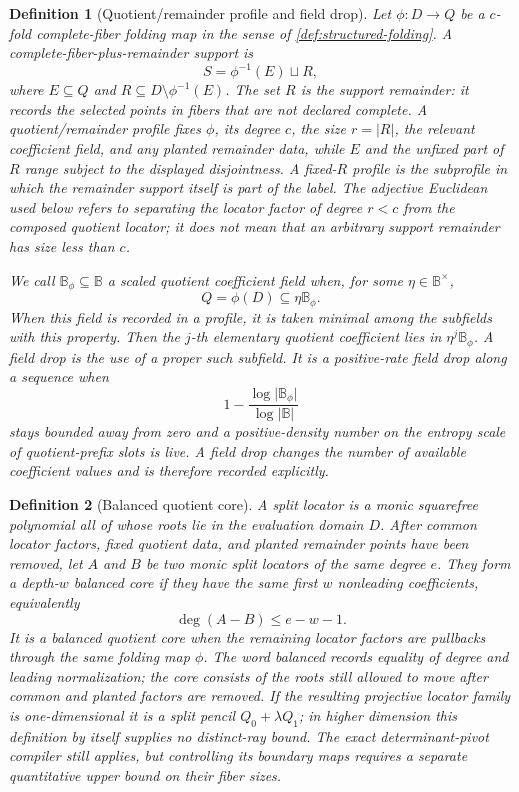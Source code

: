 \documentclass[11pt,a4paper]{amsart}
\numberwithin{equation}{section}
\newtheorem{definition}[definition]{Definition}
\theoremstyle{remark}
\newcommand{\B}{\mathbb B}
\newcommand{\abs}[1]{\lvert #1\rvert}
\begin{document}
\begin{definition}[Quotient/remainder profile and field drop]
\label{def:quotient-remainder-profile}
Let \(\phi:D\to Q\) be a \(c\)-fold complete-fiber folding map in the
sense of \cref{def:structured-folding}.  A
\emph{complete-fiber-plus-remainder support} is
\[
                  S=\phi^{-1}(E)\sqcup R,
\]
where \(E\subseteq Q\) and
\(R\subseteq D\setminus\phi^{-1}(E)\).  The set \(R\) is the
\emph{support remainder}: it records the selected points in fibers that
are not declared complete.  A \emph{quotient/remainder profile} fixes
\(\phi\), its degree \(c\), the size \(r=\abs R\), the relevant
coefficient field, and any planted remainder data, while \(E\) and the
unfixed part of \(R\) range subject to the displayed disjointness.
A fixed-\(R\) profile is the subprofile in which the remainder support
itself is part of the label.  The adjective \emph{Euclidean} used below
refers to separating the locator factor of degree \(r<c\) from the
composed quotient locator; it does not mean that an arbitrary support
remainder has size less than \(c\).

We call \(\B_\phi\subseteq\B\) a \emph{scaled quotient coefficient
field} when, for some \(\eta\in\B^\times\),
\[
                         Q=\phi(D)\subseteq\eta\B_\phi .
\]
When this field is recorded in a profile, it is taken minimal among the
subfields with this property.
Then the \(j\)-th elementary quotient coefficient lies in
\(\eta^j\B_\phi\).  A \emph{field drop} is the use of a proper such
subfield.  It is a \emph{positive-rate field drop} along a sequence when
\[
       1-\frac{\log\abs{\B_\phi}}{\log\abs\B}
\]
stays bounded away from zero and a positive-density number on the
entropy scale of quotient-prefix slots is live.  A field drop changes the number of available coefficient values and is therefore recorded explicitly.
\end{definition}

\begin{definition}[Balanced quotient core]
\label{def:balanced-quotient-core}
A \emph{split locator} is a monic squarefree polynomial all of whose roots
lie in the evaluation domain \(D\).
After common locator factors, fixed quotient data, and planted remainder
points have been removed, let \(A\) and \(B\) be two monic split
locators of the same degree \(e\).  They form a
\emph{depth-\(w\) balanced core} if they have the same first \(w\)
nonleading coefficients, equivalently
\[
                         \deg(A-B)\le e-w-1.
\]
It is a \emph{balanced quotient core} when the remaining locator factors
are pullbacks through the same folding map \(\phi\).  The word
\emph{balanced} records equality of degree and leading normalization;
the \emph{core} consists of the roots still allowed to move after common
and planted factors are removed.  If the resulting projective locator
family is one-dimensional it is a split pencil
\(Q_0+\lambda Q_1\); in higher dimension this definition by itself
supplies no distinct-ray bound.  The exact determinant-pivot compiler
still applies, but controlling its boundary maps requires a separate
quantitative upper bound on their fiber sizes.
\end{definition}
\end{document}
